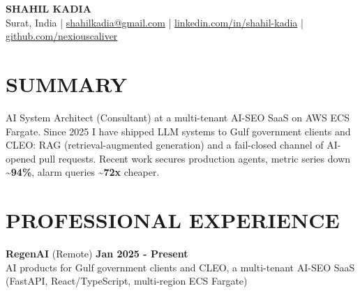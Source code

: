 \documentclass[10pt,a4paper]{article}
\newcommand{\tld}{\textasciitilde{}}%
\newcommand{\dates}[1]{\hfill {\bfseries #1}}
\begin{document}
\begin{center}
  {\LARGE\bfseries SHAHIL KADIA}\\[3pt]
  Surat, India |
  \href{mailto:shahilkadia@gmail.com}{shahilkadia@gmail.com} |
  \href{https://linkedin.com/in/shahil-kadia}{linkedin.com/in/shahil-kadia} |
  \href{https://github.com/nexiouscaliver}{github.com/nexiouscaliver}
\end{center}

\section*{SUMMARY}
AI System Architect (Consultant) at a multi-tenant AI-SEO SaaS on AWS ECS Fargate. Since
2025 I have shipped LLM systems to Gulf government clients and CLEO: RAG (retrieval-augmented
generation) and a fail-closed channel of AI-opened pull requests. Recent work secures production
agents, metric series down \textbf{\tld{}94\%}, alarm queries \textbf{\tld{}72x} cheaper.

\section*{PROFESSIONAL EXPERIENCE}

{\bfseries RegenAI} (Remote) \dates{Jan 2025 - Present}\\[1pt]
{\small AI products for Gulf government clients and CLEO, a multi-tenant AI-SEO SaaS (FastAPI, React/TypeScript, multi-region ECS Fargate)}
\medskip
\end{document}

